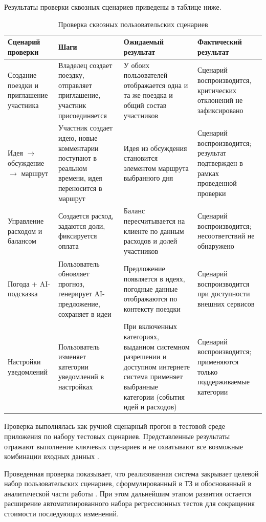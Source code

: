 Результаты проверки сквозных сценариев приведены в таблице ниже.

\begin{table}[H]
\centering
\small
\caption{Проверка сквозных пользовательских сценариев}
\begin{tabular}{|p{3.2cm}|p{3.3cm}|p{3.8cm}|p{2.6cm}|}
\hline
Сценарий проверки & Шаги & Ожидаемый результат & Фактический результат \\ 
\hline
Создание поездки и приглашение участника & Владелец создает поездку, отправляет приглашение, участник присоединяется & У обоих пользователей отображается одна и та же поездка и общий состав участников & Сценарий воспроизводится, критических отклонений не зафиксировано \\ 
\hline
Идея $\rightarrow$ обсуждение $\rightarrow$ маршрут & Участник создает идею, новые комментарии поступают в реальном времени, идея переносится в маршрут & Идея из обсуждения становится элементом маршрута выбранного дня & Сценарий воспроизводится; результат подтвержден в рамках проведенной проверки \\ 
\hline
Управление расходом и балансом & Создается расход, задаются доли, фиксируется оплата & Баланс пересчитывается на клиенте по данным расходов и долей участников & Сценарий воспроизводится; несоответствий не обнаружено \\ 
\hline
Погода + AI-подсказка & Пользователь обновляет прогноз, генерирует AI-предложение, сохраняет в идеи & Предложение появляется в идеях, погодные данные отображаются по контексту поездки & Сценарий воспроизводится при доступности внешних сервисов \\ 
\hline
Настройки уведомлений & Пользователь изменяет категории уведомлений в настройках & При включенных категориях, выданном системном разрешении и доступном интернете система применяет выбранные категории (события идей и расходов) & Сценарий воспроизводится; применяются только поддерживаемые категории \\ 
\hline
\end{tabular}
\end{table}

Проверка выполнялась как ручной сценарный прогон в тестовой среде приложения по набору тестовых сценариев. Представленные результаты отражают выполнение ключевых сценариев и не охватывают все возможные комбинации входных данных .

Проведенная проверка показывает, что реализованная система закрывает целевой набор пользовательских сценариев, сформулированный в ТЗ и обоснованный в аналитической части работы . При этом дальнейшим этапом развития остается расширение автоматизированного набора регрессионных тестов для сокращения стоимости последующих изменений.

